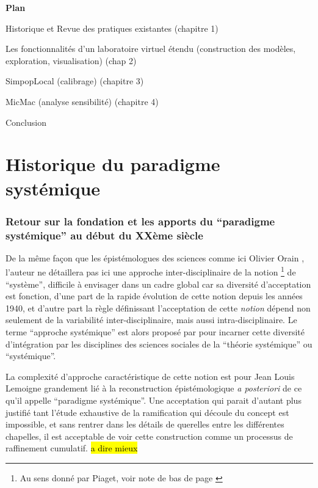

\printbibliography[heading=subbibliography]

\textbf{Plan}

Historique et Revue des pratiques existantes (chapitre 1)

Les fonctionnalités d’un laboratoire virtuel étendu (construction des modèles, exploration, visualisation) (chap 2)

SimpopLocal (calibrage) (chapitre 3)

MicMac (analyse sensibilité) (chapitre 4)

Conclusion

\appendix

\chapter{Historique du paradigme systémique}

\subsection{Retour sur la fondation et les apports du \enquote{paradigme systémique} au début du XXème siècle}
\label{ssec:systemique}

De la même façon que les épistémologues des sciences comme ici Olivier Orain \autocite{Orain2001}, l'auteur ne détaillera pas ici une approche inter-disciplinaire de la notion \footnote{Au sens donné par Piaget, voir note de bas de page \autocite {Orain2001}} de \enquote{système}, difficile à envisager dans un cadre global car sa diversité d'acceptation est fonction, d'une part de la rapide évolution de cette notion depuis les années 1940, et d'autre part la règle définissant l'acceptation de cette \textit{notion} dépend non seulement de la variabilité inter-disciplinaire, mais aussi intra-disciplinaire. Le terme \enquote{approche systémique} est alors proposé par \autocite{Orain2001} pour incarner cette diversité d'intégration par les disciplines des sciences sociales de la \enquote{théorie systémique} ou \enquote{systémique}.

La complexité d'approche caractéristique de cette notion est pour Jean Louis Lemoigne grandement lié à la reconstruction épistémologique \textit{a posteriori} de ce qu'il appelle \enquote{paradigme systémique}. Une acceptation qui parait d'autant plus justifié tant l'étude exhaustive de la ramification qui découle du concept est impossible, et sans rentrer dans les détails de querelles entre les différentes chapelles, il est acceptable de voir cette construction comme un processus de raffinement cumulatif. \hl{a dire mieux}

